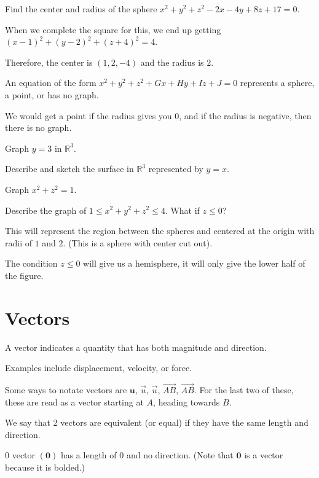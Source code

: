 \documentclass[../calc3.tex]{subfiles}
\begin{document}
\begin{example}
    Find the center and radius of the sphere $x^2+y^2+z^2-2x-4y+8z+17=0$.

    When we complete the square for this, we end up getting $(x-1)^2+(y-2)^2+(z+4)^2=4$.

    Therefore, the center is $(1,2,-4)$ and the radius is $2$.
\end{example}
\pagebreak
\begin{theorem}
    An equation of the form $x^2+y^2+z^2+Gx+Hy+Iz+J=0$ represents a sphere, a point, or has no graph.
\end{theorem}
We would get a point if the radius gives you 0, and if the radius is negative, then there is no graph.

\ex Graph $y=3$ in $\mathbb{R}^3$.

\ex Describe and sketch the surface in $\mathbb{R}^3$ represented by $y=x$.

\ex Graph $x^2+z^2=1$.

\begin{example}
    Describe the graph of $1\leq x^2+y^2+z^2\leq 4$. What if $z\leq 0$?

    This will represent the region between the spheres and centered at the origin with radii of $1$ and $2$. (This is a sphere with center cut out).
    
    The condition $z\leq 0$ will give us a hemisphere, it will only give the lower half of the figure.
\end{example}

\section{Vectors}
\begin{definition}[Vector]
    A vector indicates a quantity that has both magnitude and direction. 

    Examples include displacement, velocity, or force.
\end{definition}
Some ways to notate vectors are $\textbf{u}$, $\overrightarrow{u}$, $\vec{u}$, $\overrightarrow{AB}$, $\vec{AB}$. For the last two of these, these are read as a vector starting at $A$, heading towards $B$.

We say that 2 vectors are equivalent (or equal) if they have the same length and direction.

$0$ vector $(\textbf{0})$ has a length of $0$ and no direction. (Note that $\textbf{0}$ is a vector because it is bolded.)
\end{document}
